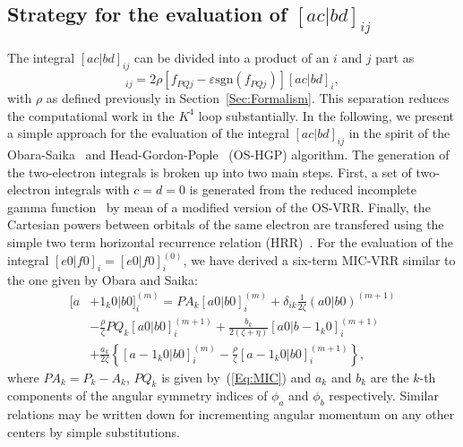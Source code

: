 \documentclass[prl,twocolumn,showpacs,twocolumngrid,superbib]{revtex4}
\begin{document}
\subsection{Strategy for the evaluation of $[ac|bd]_{ij}$}
The integral $[ac|bd]_{ij}$ can be divided into a product of an $i$ and $j$ part as
\begin{equation*}
 [ac|bd]_{ij}=2\rho[f_{PQj}-\varepsilon\mathrm{sgn}(f_{PQj}) ][ac|bd]_{i},
\end{equation*}
with $\rho$ as defined previously in Section~\ref{Sec:Formalism}. 
This separation reduces the computational work
in the $K^4$ loop substantially.
In the following, we present a simple approach for the evaluation of
the integral $[ac|bd]_{ij}$ in the spirit of the Obara-Saika~\cite{SObara86}
and Head-Gordon-Pople~\cite{MGordon88} (OS-HGP) algorithm.
The generation of the two-electron integrals is broken up into two
main steps. First, a set of two-electron integrals with $c=d=0$ is generated from the
reduced incomplete gamma function~\cite{IShavitt63} 
by mean of a modified version of the OS-VRR. Finally,
the Cartesian powers between orbitals of the same electron are transfered using 
the simple two term horizontal recurrence relation (HRR)~\cite{MGordon88}.
For the evaluation of the integral $[e0|f0]_{i}=[e0|f0]_{i}^{(0)}$, we have 
derived a six-term MIC-VRR similar
to the one given by Obara and Saika:
\begin{equation}\label{Eq:MIC-VRR}
  \begin{split}
    [a&+1_k0|b0]_{i}^{(m)}=
    PA_k[a0|b0]_{i}^{(m)}
    +\delta_{ik}\frac{1}{2\zeta}(a0|b0)^{(m+1)}\\
    &-\frac{\rho}{\zeta}PQ_k[a0|b0]_{i}^{(m+1)}
    +\frac{b_k}{2(\zeta+\eta)}[a0|b-1_k0]_{i}^{(m+1)}\\
    &+\frac{a_k}{2\zeta}
       \left\{
	 [a-1_k0|b0]_{i}^{(m)}-\frac{\rho}{\zeta}[a-1_k0|b0]_{i}^{(m+1)}
       \right\},
  \end{split}
\end{equation}
where $PA_k=P_k-A_k$, $PQ_k$ is given by~(\ref{Eq:MIC})
and $a_k$ and $b_k$ are the $k$-th components of the angular 
symmetry indices of $\phi_a$ and $\phi_b$ respectively. 
Similar relations may be written down for incrementing angular momentum 
on any other centers by simple substitutions.
\end{document}

